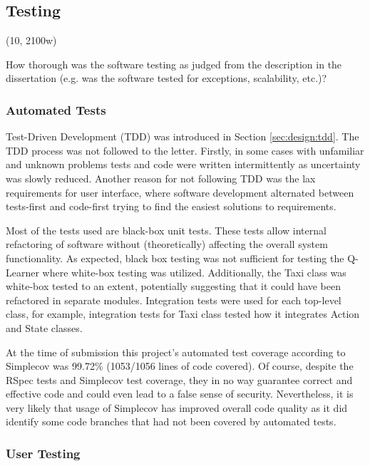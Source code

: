 \subsection{Testing}
\label{sec:implementation:testing}

(10, 2100w)

How thorough was the software testing as judged from the description in the
dissertation (e.g. was the software tested for exceptions, scalability, etc.)?


\subsubsection{Automated Tests}
\label{sec:implementation:testing:automated}

Test-Driven Development (TDD) was introduced in Section \ref{sec:design:tdd}.
The TDD process was not followed to the letter. Firstly, in some cases with
unfamiliar and unknown problems tests and code were written intermittently as
uncertainty was slowly reduced. Another reason for not following TDD was the
lax requirements for user interface, where software development alternated
between tests-first and code-first trying to find the easiest solutions to
requirements.

Most of the tests used are black-box unit tests. These tests allow internal
refactoring of software without (theoretically) affecting the overall system
functionality. As expected, black box testing was not sufficient for testing
the Q-Learner where white-box testing was utilized. Additionally, the Taxi
class was white-box tested to an extent, potentially suggesting that it could
have been refactored in separate modules. Integration tests were used for each
top-level class, for example, integration tests for Taxi class tested how it
integrates Action and State classes.

At the time of submission this project's automated test coverage according to
Simplecov was 99.72\% (1053/1056 lines of code covered). Of course, despite the
RSpec tests and Simplecov test coverage, they in no way guarantee correct and
effective code and could even lead to a false sense of security. Nevertheless,
it is very likely that usage of Simplecov has improved overall code quality as
it did identify some code branches that had not been covered by automated
tests.


\subsubsection{User Testing}


